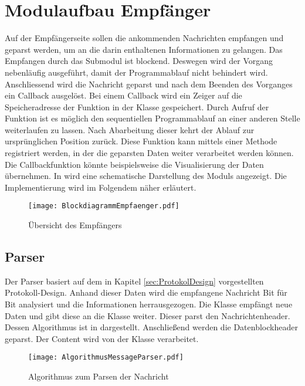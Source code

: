 \section{Modulaufbau Empf{\"a}nger}

Auf der Empf{\"a}ngerseite sollen die ankommenden Nachrichten empfangen und geparst
werden, um an die darin enthaltenen Informationen zu gelangen. Das Empfangen
durch das Submodul  ist blockend. Deswegen wird der Vorgang
nebenl{\"a}ufig ausgef{\"u}hrt, damit der Programmablauf nicht behindert wird. Anschliessend wird
die Nachricht geparst und nach dem Beenden des Vorganges ein Callback
ausgel{\"o}st. Bei einem Callback wird ein Zeiger auf die Speicheradresse der
Funktion in der Klasse gespeichert. Durch Aufruf der Funktion ist es
m{\"o}glich den sequentiellen Programmablauf an einer anderen Stelle
weiterlaufen zu lassen. Nach Abarbeitung dieser kehrt der Ablauf zur
urspr{\"u}nglichen Position zur{\"u}ck. Diese Funktion kann mittels einer
Methode registriert werden, in der die geparsten Daten weiter verarbeitet werden
k{\"o}nnen.
Die Callbackfunktion k{\"o}nnte beispielsweise die Visualisierung der Daten
{\"u}bernehmen. \newline 
In  wird eine schematische Darstellung des
Moduls angezeigt. Die Implementierung wird im Folgendem n{\"a}her erl{\"a}utert.

\begin{figure}[H]
\centering
\texttt{[image: BlockdiagrammEmpfaenger.pdf]}
\caption{{\"U}bersicht des Empf{\"a}ngers}
\label{fig:BlockdiagrammEmpfaenger}
\end{figure}

\subsection{Parser}

Der Parser basiert auf dem in Kapitel \ref{sec:ProtokolDesign}
vorgestellten Protokoll-Design.
Anhand dieser Daten wird die empfangene Nachricht Bit f{\"u}r Bit analysiert
und die Informationen herrausgezogen. 
Die Klasse  empf{\"a}ngt neue Daten und gibt diese an
die Klasse  weiter. Dieser parst den Nachrichtenheader.
Dessen Algorithmus ist in  dargestellt.
Anschlie{\ss}end werden die Datenblockheader geparst. Der Content wird von der
Klasse  verarbeitet.

\begin{figure}[H]
\centering
\texttt{[image: AlgorithmusMessageParser.pdf]}
\caption{Algorithmus zum Parsen der Nachricht}
\label{fig:AlgorithmusMessageParser}
\end{figure}

